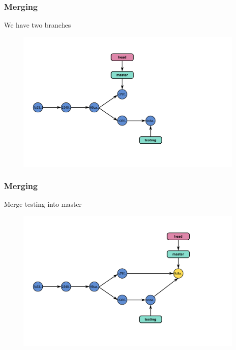 \documentclass[11pt]{beamer}
\begin{document}

\begin{frame}[fragile]
\frametitle{Merging}
We have two branches
\begin{figure}[htp]
 \centering
 \includegraphics[scale=0.35]{branch4.png}
\end{figure}


\end{frame}


\begin{frame}[fragile]
\frametitle{Merging}
Merge testing into master
\begin{figure}[htp]
 \centering
 \includegraphics[scale=0.35]{branch5.png}
\end{figure}


\end{frame}

\end{document}
